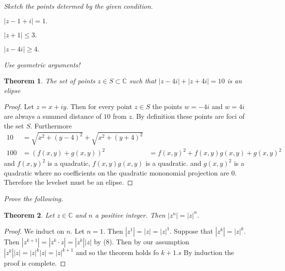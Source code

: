 \documentclass[letter]{article}
\newtheorem{theorem}{Theorem}
\newenvironment{menumerate}{%
  \edef\backupindent{\the\parindent}%
  \enumerate%
  \setlength{\parindent}{\backupindent}%
}{\endenumerate}
\begin{document}
\begin{menumerate}
	\item \emph{Sketch the points determed by the given condition.}
	\begin{menumerate}
		\item $|z-1 + i| = 1.$ \\[3cm]
		\item $|z+1| \leq 3.$ \\[3cm]
		\item $|z -4i| \geq 4.$ \\[3cm]
	\end{menumerate}
	\item \emph{Use geometric arguments!}
	\begin{menumerate}
		\item \begin{theorem}
			The set of points $z \in S \subset \mathbb{C}$ such that $|z - 4i| + |z+4i| = 10$ is an elipse
		\end{theorem}
		\begin{proof}
			Let $z = x + iy.$ Then for every point $z \in S$ the points $w = -4i$ and $w = 4i$ are always a summed distance of $10$ from $z$. By definition these points are foci of the set $S$.  Furthermore 
			\begin{equation}
				\begin{aligned}
					10 &= \sqrt{x^2 + (y-4)^2} + \sqrt{x^2 + (y + 4)^2} \\
					100 &= (f(x,y) + g(x,y))^2
					&= f(x,y)^2 + f(x,y)g(x,y) + g(x,y)^2
				\end{aligned}
			\end{equation}
			and $f(x,y)^2$ is a quadratic, $f(x,y)g(x,y)$ is a quadratic. and $g(x,y)^2$ is a quadratic where no coefficients on the quadratic mononomial projection are $0$. Therefore the levelset must be an elipse. 
		\end{proof}
	\end{menumerate}

	\setcounter{enumi}{8}
	\item \emph{Prove the following.}
	\begin{theorem}
		Let $z \in \mathbb{C}$ and $n$ a positive integer. Then
		$|z^n| = |z|^n.$
	\end{theorem}
	\begin{proof}
		We induct on $n$. Let $n=1.$ Then $|z^1| = |z| = |z|^1.$
		Suppose that $|z^k| = |z|^k.$ Then $|z^{k+1}| = |z^k\cdot z| =|z^k||z|$ by (8). Then by our assumption $|z^k||z| = |z|^k|z| = |z|^{k+1}$ and so the theorem holds fo $k+1.s$ By induction the proof is complete.
	\end{proof}
\end{menumerate}
\end{document}
